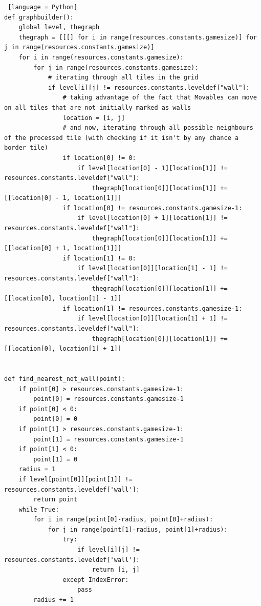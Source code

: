 \documentclass[11pt,a4paper,notitlepage]{report}
\begin{document}
\begin{lstlisting} [language = Python]
def graphbuilder():
    global level, thegraph
    thegraph = [[[] for i in range(resources.constants.gamesize)] for j in range(resources.constants.gamesize)]
    for i in range(resources.constants.gamesize):
        for j in range(resources.constants.gamesize):
            # iterating through all tiles in the grid
            if level[i][j] != resources.constants.leveldef["wall"]:
                # taking advantage of the fact that Movables can move on all tiles that are not initially marked as walls
                location = [i, j]
                # and now, iterating through all possible neighbours of the processed tile (with checking if it isn't by any chance a border tile)
                if location[0] != 0:
                    if level[location[0] - 1][location[1]] != resources.constants.leveldef["wall"]:
                        thegraph[location[0]][location[1]] += [[location[0] - 1, location[1]]]
                if location[0] != resources.constants.gamesize-1:
                    if level[location[0] + 1][location[1]] != resources.constants.leveldef["wall"]:
                        thegraph[location[0]][location[1]] += [[location[0] + 1, location[1]]]
                if location[1] != 0:
                    if level[location[0]][location[1] - 1] != resources.constants.leveldef["wall"]:
                        thegraph[location[0]][location[1]] += [[location[0], location[1] - 1]]
                if location[1] != resources.constants.gamesize-1:
                    if level[location[0]][location[1] + 1] != resources.constants.leveldef["wall"]:
                        thegraph[location[0]][location[1]] += [[location[0], location[1] + 1]]


def find_nearest_not_wall(point):
    if point[0] > resources.constants.gamesize-1:
        point[0] = resources.constants.gamesize-1
    if point[0] < 0:
        point[0] = 0
    if point[1] > resources.constants.gamesize-1:
        point[1] = resources.constants.gamesize-1
    if point[1] < 0:
        point[1] = 0
    radius = 1
    if level[point[0]][point[1]] != resources.constants.leveldef['wall']:
        return point
    while True:
        for i in range(point[0]-radius, point[0]+radius):
            for j in range(point[1]-radius, point[1]+radius):
                try:
                    if level[i][j] != resources.constants.leveldef['wall']:
                        return [i, j]
                except IndexError:
                    pass
        radius += 1



\end{lstlisting}
\end{document}

